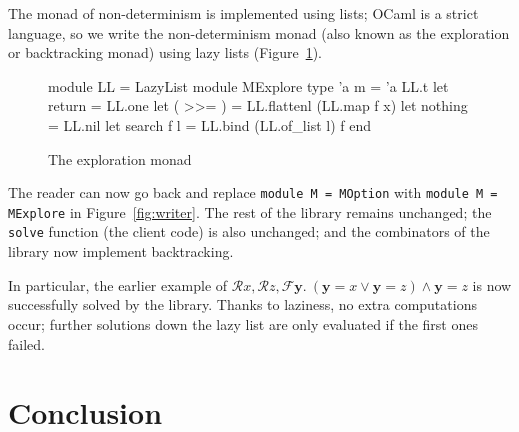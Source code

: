 \documentclass{easychair}
\def\li{\lstinline}
\newcommand{\fref}[1]{Figure~\ref{fig:#1}}
\newcommand{\R}{\ensuremath{\mathcal{R}}} %
\newcommand{\f}[1]{\ensuremath{\mathbf{#1}}} %
\newcommand{\F}{\ensuremath{\mathcal{F}}} %
\begin{document}
The monad of non-determinism is implemented using lists; OCaml is a strict
language, so we write the non-determinism monad (also known as the exploration
or backtracking monad) using lazy lists (\fref{mexplore}).

\begin{figure}
  \centering
\begin{ocaml}
module LL = LazyList
module MExplore
  type 'a m = 'a LL.t
  let return = LL.one
  let ( >>= ) = LL.flattenl (LL.map f x)
  let nothing = LL.nil
  let search f l = LL.bind (LL.of_list l) f
end
\end{ocaml}
  \caption{The exploration monad}
  \label{fig:mexplore}
\end{figure}

The reader can now go back and replace \li+module M = MOption+ with
\li+module M = MExplore+ in \fref{writer}. The rest of the library remains
unchanged; the \li+solve+ function (the client code) is also unchanged; and the
combinators of the library now implement backtracking.

In particular, the earlier example of $\R x, \R z, \F \f
y.\ (\f y = x \vee \f y = z) \wedge \f y = z$ is now successfully solved by the
library. Thanks to laziness, no extra computations occur; further solutions down
the lazy list are only evaluated if the first ones failed.

\section{Conclusion}





\end{document}
